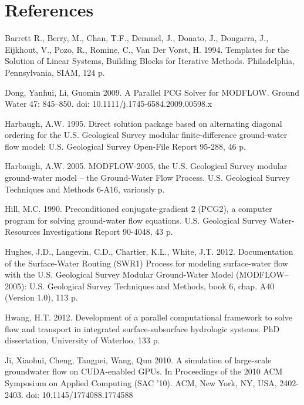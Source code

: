 \documentclass[12pt]{article}
\begin{document}
\section*{\bf References}
\begin{description}

\item Barrett R., Berry, M.,  Chan, T.F., Demmel, J., Donato, J., Dongarra, J., Eijkhout, V.,  Pozo, R., Romine, C., Van Der Vorst, H. 1994. Templates for the Solution of Linear Systems, Building Blocks for Iterative Methods. Philadelphia, Pennsylvania, SIAM, 124 p.

\item Dong, Yanhui, Li, Guomin 2009. A Parallel PCG Solver for MODFLOW. Ground Water 47: 845–850. doi: 10.1111/j.1745-6584.2009.00598.x

\item \color{cyan} Harbaugh, A.W. 1995. Direct solution package based on alternating diagonal ordering for the U.S. Geological Survey modular finite-difference ground-water flow model: U.S. Geological Survey Open-File Report 95-288, 46 p.\color{black}

\item Harbaugh, A.W. 2005. MODFLOW-2005, the U.S. Geological Survey modular ground-water model -- the Ground-Water Flow Process. U.S. Geological Survey Techniques and Methods 6-A16, variously p.

\item Hill, M.C. 1990. Preconditioned conjugate-gradient 2 (PCG2), a computer program for solving ground-water flow equations. U.S. Geological Survey Water-Resources Investigations Report 90-4048, 43 p.

\item \color{cyan} Hughes, J.D., Langevin, C.D., Chartier, K.L., White, J.T. 2012. Documentation of the Surface-Water Routing (SWR1) Process for modeling surface-water flow with the U.S. Geological Survey Modular Ground-Water Model (MODFLOW–2005): U.S. Geological Survey Techniques and Methods, book 6, chap. A40 (Version 1.0), 113 p.\color{black}

\item \color{blue} Hwang, H.T. 2012. Development of a parallel computational framework to solve flow and transport in integrated surface-subsurface hydrologic systems. PhD dissertation, University of Waterloo, 133 p.\color{black}

\item \color{cyan} Ji, Xiaohui, Cheng, Tangpei, Wang, Qun 2010. A simulation of large-scale groundwater flow on CUDA-enabled GPUs. In Proceedings of the 2010 ACM Symposium on Applied Computing (SAC '10). ACM, New York, NY, USA, 2402-2403. doi: 10.1145/1774088.1774588\color{black}


\end{description}
\end{document}
